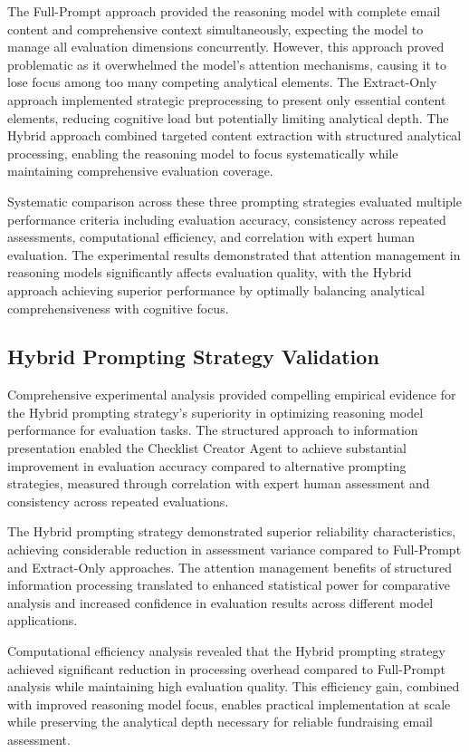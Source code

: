 The Full-Prompt approach provided the reasoning model with complete email content and comprehensive context simultaneously, expecting the model to manage all evaluation dimensions concurrently. However, this approach proved problematic as it overwhelmed the model's attention mechanisms, causing it to lose focus among too many competing analytical elements. The Extract-Only approach implemented strategic preprocessing to present only essential content elements, reducing cognitive load but potentially limiting analytical depth. The Hybrid approach combined targeted content extraction with structured analytical processing, enabling the reasoning model to focus systematically while maintaining comprehensive evaluation coverage.

Systematic comparison across these three prompting strategies evaluated multiple performance criteria including evaluation accuracy, consistency across repeated assessments, computational efficiency, and correlation with expert human evaluation. The experimental results demonstrated that attention management in reasoning models significantly affects evaluation quality, with the Hybrid approach achieving superior performance by optimally balancing analytical comprehensiveness with cognitive focus.

\subsection{Hybrid Prompting Strategy Validation}

Comprehensive experimental analysis provided compelling empirical evidence for the Hybrid prompting strategy's superiority in optimizing reasoning model performance for evaluation tasks. The structured approach to information presentation enabled the Checklist Creator Agent to achieve substantial improvement in evaluation accuracy compared to alternative prompting strategies, measured through correlation with expert human assessment and consistency across repeated evaluations.

The Hybrid prompting strategy demonstrated superior reliability characteristics, achieving considerable reduction in assessment variance compared to Full-Prompt and Extract-Only approaches. The attention management benefits of structured information processing translated to enhanced statistical power for comparative analysis and increased confidence in evaluation results across different model applications.

Computational efficiency analysis revealed that the Hybrid prompting strategy achieved significant reduction in processing overhead compared to Full-Prompt analysis while maintaining high evaluation quality. This efficiency gain, combined with improved reasoning model focus, enables practical implementation at scale while preserving the analytical depth necessary for reliable fundraising email assessment.

